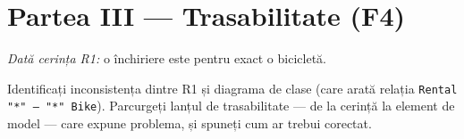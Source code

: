 \documentclass[12pt,a4paper]{article}
\begin{document}
\vspace{5.5cm}

\section*{Partea III — Trasabilitate (F4)}

\textit{Dată cerința R1:} o închiriere este pentru exact o bicicletă.

Identificați inconsistența dintre R1 și diagrama de clase (care arată
relația \texttt{Rental "*" -- "*" Bike}). Parcurgeți lanțul de
trasabilitate — de la cerință la element de model — care expune
problema, și spuneți cum ar trebui corectat.

\vspace{5.5cm}
\end{document}
